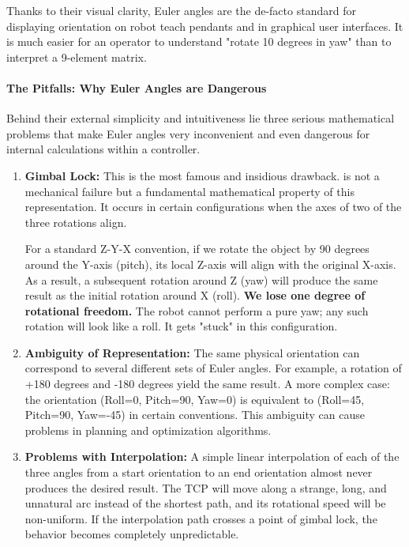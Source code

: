 Thanks to their visual clarity, Euler angles are the de-facto standard for displaying orientation on robot teach pendants and in graphical user interfaces. It is much easier for an operator to understand "rotate 10 degrees in yaw" than to interpret a 9-element matrix.

\paragraph{The Pitfalls: Why Euler Angles are Dangerous}
Behind their external simplicity and intuitiveness lie three serious mathematical problems that make Euler angles very inconvenient and even dangerous for internal calculations within a controller.

\begin{enumerate}
    \item \textbf{Gimbal Lock:} This is the most famous and insidious drawback.  is not a mechanical failure but a fundamental mathematical property of this representation. It occurs in certain configurations when the axes of two of the three rotations align.
    
    For a standard Z-Y-X convention, if we rotate the object by 90 degrees around the Y-axis (pitch), its local Z-axis will align with the original X-axis. As a result, a subsequent rotation around Z (yaw) will produce the same result as the initial rotation around X (roll). \textbf{We lose one degree of rotational freedom.} The robot cannot perform a pure yaw; any such rotation will look like a roll. It gets "stuck" in this configuration.

    \item \textbf{Ambiguity of Representation:} The same physical orientation can correspond to several different sets of Euler angles. For example, a rotation of +180 degrees and -180 degrees yield the same result. A more complex case: the orientation (Roll=0, Pitch=90, Yaw=0) is equivalent to (Roll=45, Pitch=90, Yaw=-45) in certain conventions. This ambiguity can cause problems in planning and optimization algorithms.

    \item \textbf{Problems with Interpolation:} A simple linear interpolation of each of the three angles from a start orientation to an end orientation almost never produces the desired result. The TCP will move along a strange, long, and unnatural arc instead of the shortest path, and its rotational speed will be non-uniform. If the interpolation path crosses a point of gimbal lock, the behavior becomes completely unpredictable.
\end{enumerate}

